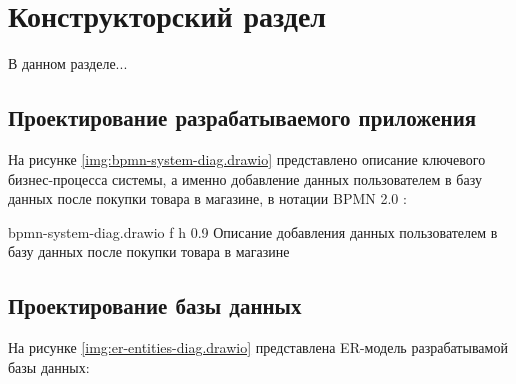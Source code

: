 \chapter{Конструкторский раздел}

В данном разделе...

\section{Проектирование разрабатываемого приложения}

На рисунке \ref{img:bpmn-system-diag.drawio} представлено описание ключевого бизнес-процесса системы, а именно добавление данных пользователем в базу данных после покупки товара в магазине, в нотации BPMN 2.0 \cite{info_bpmn}:

{bpmn-system-diag.drawio} %
{f} %
{h} %
{0.9\textwidth} %
{Описание добавления данных пользователем в базу данных после покупки товара в магазине} %

\section{Проектирование базы данных}

На рисунке \ref{img:er-entities-diag.drawio} представлена ER-модель разрабатывамой базы данных:

